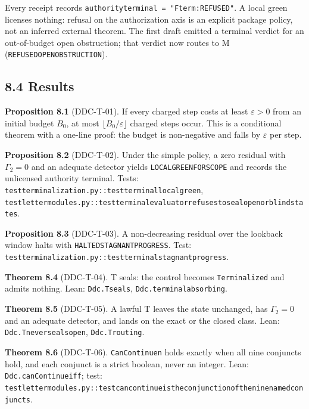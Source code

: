 \documentclass[
  11pt,
]{article}
\renewcommand{\_}{\ddcunderscore\allowbreak}
\begin{document}
Every receipt records
\texttt{authority\_terminal\ =\ "F\_term:REFUSED"}. A local green
licenses nothing: refusal on the authorization axis is an explicit
package policy, not an inferred external theorem. The first draft
emitted a terminal verdict for an out-of-budget open obstruction; that
verdict now routes to M (\texttt{REFUSED\_OPEN\_OBSTRUCTION}).

\subsection{8.4 Results}\label{results-7}

\textbf{Proposition 8.1} (DDC-T-01). If every charged step costs at
least \(\varepsilon > 0\) from an initial budget \(B_0\), at most
\(\lfloor B_0 / \varepsilon \rfloor\) charged steps occur. This is a
conditional theorem with a one-line proof: the budget is non-negative
and falls by \(\varepsilon\) per step.

\textbf{Proposition 8.2} (DDC-T-02). Under the simple policy, a zero
residual with \(\Gamma_2 = 0\) and an adequate detector yields
\texttt{LOCAL\_GREEN\_FOR\_SCOPE} and records the unlicensed authority
terminal. Tests:
\texttt{test\_terminalization.\allowbreak py::test\_terminal\_local\_green},
\texttt{test\_letter\_modules.\allowbreak py::test\_terminal\_evaluator\_refuses\_to\_seal\_open\_or\_blind\_states}.

\textbf{Proposition 8.3} (DDC-T-03). A non-decreasing residual over the
lookback window halts with \texttt{HALTED\_STAGNANT\_PROGRESS}. Test:
\texttt{test\_terminalization.\allowbreak py::test\_terminal\_stagnant\_progress}.

\textbf{Theorem 8.4} (DDC-T-04). T seals: the control becomes
\texttt{Terminalized} and admits nothing. Lean: \texttt{Ddc.\allowbreak T\_seals},
\texttt{Ddc.\allowbreak terminal\_absorbing}.

\textbf{Theorem 8.5} (DDC-T-05). A lawful T leaves the state unchanged,
has \(\Gamma_2 = 0\) and an adequate detector, and lands on the exact or
the closed class. Lean: \texttt{Ddc.\allowbreak T\_never\_seals\_open},
\texttt{Ddc.\allowbreak T\_routing}.

\textbf{Theorem 8.6} (DDC-T-06). \texttt{Can\allowbreak Continue\_n} holds exactly
when all nine conjuncts hold, and each conjunct is a strict boolean,
never an integer. Lean: \texttt{Ddc.\allowbreak can\allowbreak Continue\_iff}; test:
\texttt{test\_letter\_modules.\allowbreak py::test\_can\_continue\_is\_the\_conjunction\_of\_the\_nine\_named\_conjuncts}.
\end{document}
